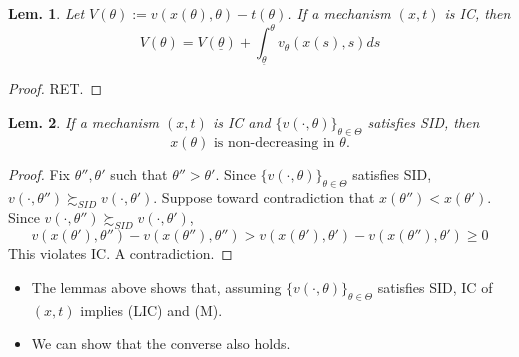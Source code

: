 \documentclass[11pt,a4paper,dvipdfmx]{article}
\theoremstyle{plain}
\newtheorem{lem}{Lem.}[section]
\newcommand{\1}{\mathbbm{1}}
\DeclareMathOperator*{\argmax}{argmax}
\begin{document}
\begin{lem}
	Let $V(\theta) := v(x(\theta), \theta) - t(\theta)$.
	If a mechanism $(x,t)$ is IC, then
	\begin{equation}
	V(\theta) = V(\underline{\theta}) + \int_{\underline{\theta}}^\theta
	 v_\theta(x(s), s) ds \tag{LIC}	
	\end{equation}
\end{lem}
\begin{proof}
	RET.
\end{proof}

\begin{lem}
	If a mechanism $(x,t)$ is IC and $\{v(\cdot, \theta)\}_{\theta \in \Theta}$ satisfies SID, then
	\begin{equation}
	\text{$x(\theta)$ is non-decreasing in $\theta$.} \tag{M}
	\end{equation}
\end{lem}
\begin{proof}
	Fix $\theta'', \theta'$ such that $\theta'' > \theta'$. Since $\{v(\cdot, \theta)\}_{\theta \in \Theta}$ satisfies SID, $v(\cdot, \theta'') \succsim_{SID} v(\cdot, \theta')$.
	Suppose toward contradiction that $x(\theta'') < x(\theta')$. Since $v(\cdot, \theta'') \succsim_{SID} v(\cdot, \theta')$,
	\[
	v(x(\theta'), \theta'') - v(x(\theta''), \theta'')
	> v(x(\theta'), \theta') - v(x(\theta''), \theta') \geq 0
	\]
	This violates IC. A contradiction.
\end{proof}

\begin{itemize}
	\item The lemmas above shows that, assuming $\{v(\cdot, \theta)\}_{\theta \in \Theta}$ satisfies SID, IC of $(x,t)$ implies (LIC) and (M).
	\item We can show that the converse also holds.
\end{itemize}
\end{document}
